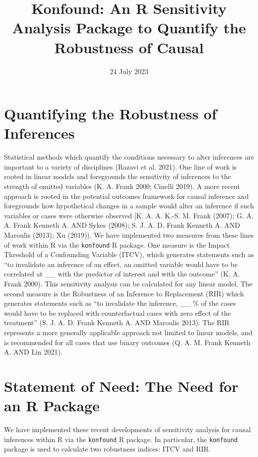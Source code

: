 \documentclass[
]{article}
\title{Konfound: An R Sensitivity Analysis Package to Quantify the
Robustness of Causal}
\author{}
\date{\vspace{-2.5em}24 July 2023}
\begin{document}
\maketitle

\hypertarget{quantifying-the-robustness-of-inferences}{%
\section{Quantifying the Robustness of
Inferences}\label{quantifying-the-robustness-of-inferences}}

Statistical methods which quantify the conditions necessary to alter
inferences are important to a variety of disciplines (Razavi et al.
2021). One line of work is rooted in linear models and foregrounds the
sensitivity of inferences to the strength of omitted variables (K. A.
Frank 2000; Cinelli 2019). A more recent approach is rooted in the
potential outcomes framework for causal inference and foregrounds how
hypothetical changes in a sample would alter an inference if such
variables or cases were otherwise observed {[}K. A. A. K.-S. M. Frank
(2007); G. A. A. Frank Kenneth A. AND Sykes (2008); S. J. A. D. Frank
Kenneth A. AND Maroulis (2013); Xu (2019)). We have implemented two
measures from these lines of work within R via the \texttt{konfound} R
package. One measure is the Impact Threshold of a Confounding Variable
(ITCV), which generates statements such as ``to invalidate an inference
of an effect, an omitted variable would have to be correlated at \_\_
with the predictor of interest and with the outcome'' (K. A. Frank
2000). This sensitivity analysis can be calculated for any linear model.
The second measure is the Robustness of an Inference to Replacement
(RIR) which generates statements such as ``to invalidate the inference,
\_\_ \% of the cases would have to be replaced with counterfactual cases
with zero effect of the treatment'' (S. J. A. D. Frank Kenneth A. AND
Maroulis 2013). The RIR represents a more generally applicable approach
not limited to linear models, and is recommended for all cases that use
binary outcomes (Q. A. M. Frank Kenneth A. AND Lin 2021).

\hypertarget{statement-of-need-the-need-for-an-r-package}{%
\section{Statement of Need: The Need for an R
Package}\label{statement-of-need-the-need-for-an-r-package}}

We have implemented these recent developments of sensitivity analysis
for causal inferences within R via the \texttt{konfound} R package. In
particular, the \texttt{konfound} package is used to calculate two
robustness indices: ITCV and RIR.
\end{document}
